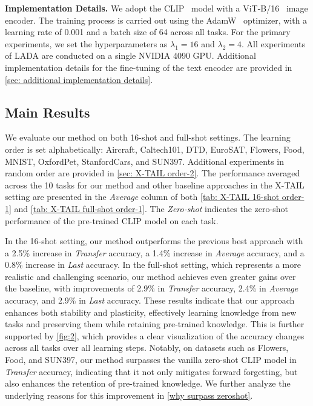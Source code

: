 \documentclass{article}
\theoremstyle{plain}
\theoremstyle{definition}
\theoremstyle{remark}
\begin{document}
\textbf{Implementation Details.}
We adopt the CLIP~\cite{radford2021learning} model with a ViT-B/16~\cite{dosovitskiy2021an} image encoder. The training process is carried out using the AdamW~\cite{loshchilov2018decoupled} optimizer, with a learning rate of 0.001 and a batch size of 64 across all tasks. For the primary experiments, we set the hyperparameters as $\lambda_1=16$ and $\lambda_2=4$. All experiments of LADA are conducted on a single NVIDIA 4090 GPU. Additional implementation details for the fine-tuning of the text encoder are provided in \cref{sec: additional implementation details}.

\subsection{Main Results}
\label{sec:Main Results}
We evaluate our method on both 16-shot and full-shot settings. The learning order is set alphabetically: Aircraft, Caltech101, DTD, EuroSAT, Flowers, Food, MNIST, OxfordPet, StanfordCars, and SUN397. Additional experiments in random order are provided in \cref{sec: X-TAIL order-2}. The performance averaged across the 10 tasks for our method and other baseline approaches in the X-TAIL setting are presented in the \emph{Average} column of both \cref{tab: X-TAIL 16-shot order-1} and \cref{tab: X-TAIL full-shot order-1}. The \emph{Zero-shot} indicates the zero-shot performance of the pre-trained CLIP model on each task.

In the 16-shot setting, our method outperforms the previous best approach with a 2.5\% increase in \emph{Transfer} accuracy, a 1.4\% increase in \emph{Average} accuracy, and a 0.8\% increase in \emph{Last} accuracy. In the full-shot setting, which represents a more realistic and challenging scenario, our method achieves even greater gains over the baseline, with improvements of 2.9\% in \emph{Transfer} accuracy, 2.4\% in \emph{Average} accuracy, and 2.9\% in \emph{Last} accuracy. These results indicate that our approach enhances both stability and plasticity, effectively learning knowledge from new tasks and preserving them while retaining pre-trained knowledge. This is further supported by \cref{fig:2}, which provides a clear visualization of the accuracy changes across all tasks over all learning steps. Notably, on datasets such as Flowers, Food, and SUN397, our method surpasses the vanilla zero-shot CLIP model in \emph{Transfer} accuracy, indicating that it not only mitigates forward forgetting, but also enhances the retention of pre-trained knowledge. We further analyze the underlying reasons for this improvement in \cref{why surpass zeroshot}.
\end{document}
